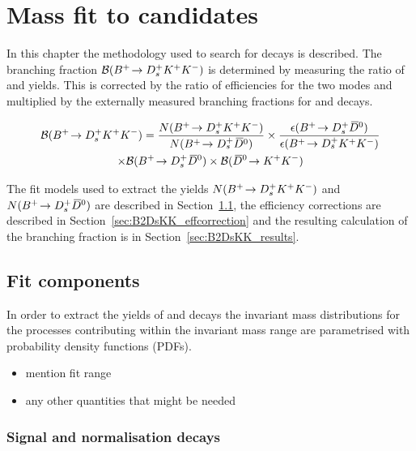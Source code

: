 \chapter{Mass fit to \decay{\Bp}{\Dsp\Kp\Km} candidates} 
\label{ch:B2DsKK}

\minitoc

In this chapter the methodology used to search for \decay{\Bp}{\Dsp\Kp\Km} decays is described.
The branching fraction ${\mathcal{B}}({{{B}^+}}\!\rightarrow {\ensuremath{{D}^+_{s}}}{\ensuremath{{K}^+}}{\ensuremath{{K}^-}})$ is determined by measuring the ratio of \decay{\Bp}{\Dsp\Kp\Km} and \decay{\Bp}{\Dsp\Dzb} yields. 
This is corrected by the ratio of efficiencies for the two modes and multiplied by the externally measured branching fractions for \decay{\Bp}{\Dsp\Dzb} and \decay{\Dzb}{\Kp\Km} decays.

\begin{multline}
\BF(\decay{\Bp}{\Dsp\Kp\Km}) = \frac{N(\decay{\Bp}{\Dsp\Kp\Km})}{N(\decay{\Bp}{\Dsp\Dzb})} \times  \frac{\epsilon(\decay{\Bp}{\Dsp\Dzb})}{\epsilon(\decay{\Bp}{\Dsp\Kp\Km})}\\ 
\times \BF(\decay{\Bp}{\Dsp\Dzb}) \times \BF(\decay{\Dzb}{\Kp\Km}) 
\end{multline}

The fit models used to extract the yields $N({{{B}^+}}\!\rightarrow {\ensuremath{{D}^+_{s}}}{\ensuremath{{K}^+}}{\ensuremath{{K}^-}})$ and $N({{{B}^+}}\!\rightarrow {\ensuremath{{D}^+_{s}}}{\ensuremath{{\kern 0.2em\overline{\kern -0.2em D}{}}{}^0}})$ are described in Section~\ref{sec:B2DsKK_fitcomps}, the efficiency corrections are described in Section~\ref{sec:B2DsKK_effcorrection} and the resulting calculation of the branching fraction is in Section~\ref{sec:B2DsKK_results}.


\section{Fit components}
\label{sec:B2DsKK_fitcomps}

In order to extract the yields of \decay{\Bp}{\Dsp\Dzb} and \decay{\Bp}{\Dsp\Kp\Km} decays the invariant mass distributions for the processes contributing within the invariant mass range are parametrised with probability density functions (PDFs).

{\color{Red}
\begin{itemize}
\item mention fit range
\item any other quantities that might be needed
\end{itemize}
}


\subsection{Signal and normalisation decays}
\label{sec:B2DsKK_sigcomps}

